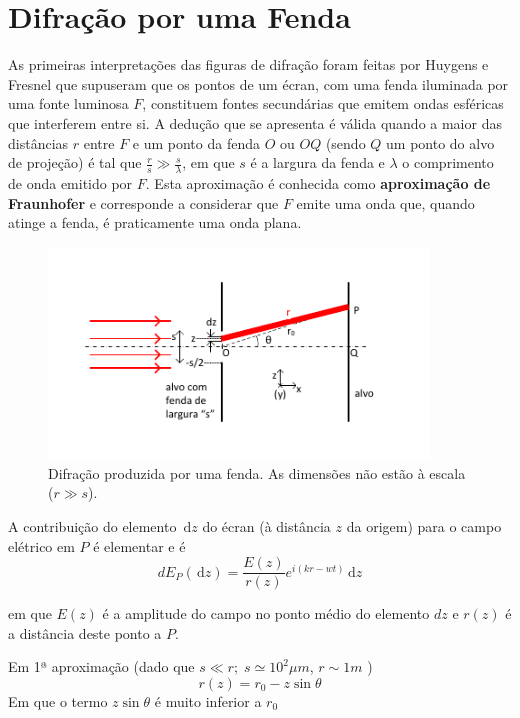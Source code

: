 \documentclass[a4paper,12pt]{article}
\newcommand{\ud}{\,\mathrm{d}}
\begin{document}

\section{ \sf Difração por uma Fenda}
\label{sec:fenda} 
As primeiras interpretações das figuras de difração foram feitas por Huygens e Fresnel que supuseram que os pontos de um écran, com uma fenda iluminada por uma fonte luminosa $F$, constituem fontes secundárias que emitem ondas esféricas que interferem entre si. A dedução que se apresenta é válida quando a maior das distâncias $r$ entre $F$ e um ponto da fenda $O$ ou $OQ$ (sendo $Q$ um ponto do alvo de projeção) é tal que $\frac{r}{s} \gg \frac{s}{\lambda}$, em que $s$ é a largura da fenda e $\lambda$ o comprimento de onda emitido por $F$. Esta aproximação é conhecida como {\bf aproximação de Fraunhofer} e corresponde a considerar que $F$ emite uma onda que, quando atinge a fenda, é praticamente uma onda plana.

\begin{figure}[tb]  \centering 
	\includegraphics[width=0.9\textwidth]{fenda} 
	\caption{Difração produzida por uma fenda. As dimensões não estão à escala ($r \gg s$).\label{fig:3}} 
\end{figure}

A contribuição do elemento $\ud z$ do écran (à distância $z$ da origem) para o campo elétrico em $P$ é elementar e é 
\begin{equation}
	\label{eq:25} dE_P(\ud z) = \frac{E(z)}{r(z)} e^{i(kr- wt)} \ud z 
\end{equation}

em que $E(z)$ é a amplitude do campo no ponto médio do elemento $dz$ e $r(z)$ é a distância deste ponto a $P$.

Em 1ª aproximação (dado que $s \ll r;\; s \simeq 10^2 \mu m$, $r \sim 1m$ ) 
\begin{equation}
	\label{eq:26} r(z)= r_0 - z \sin \theta 
\end{equation}
Em que o termo $z \sin \theta $ é muito inferior a $r_0$
\end{document}
